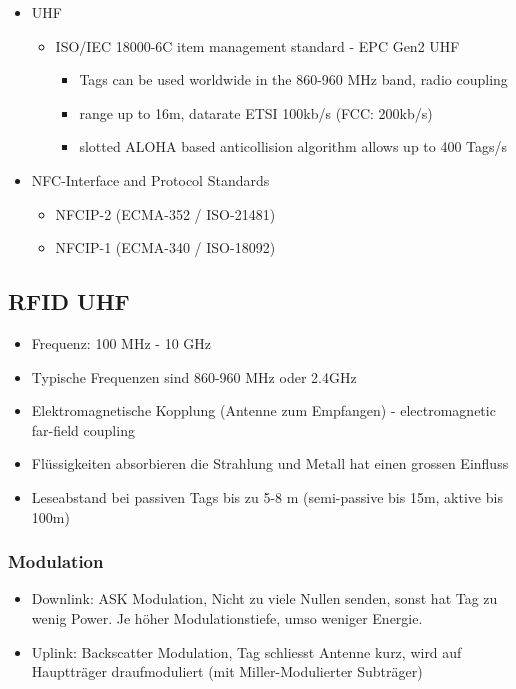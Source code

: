 \begin{itemize}
\begin{itemize}
			\end{itemize}
		\item UHF
			\begin{itemize}
				\item ISO/IEC 18000-6C item management standard - EPC Gen2 UHF
					\begin{itemize}
						\item Tags can be used worldwide in the 860-960 MHz band, radio coupling
						\item range up to 16m, datarate ETSI 100kb/s (FCC: 200kb/s)
						\item slotted ALOHA based anticollision algorithm allows up to 400 Tags/s
					\end{itemize}
			\end{itemize}
		\item NFC-Interface and Protocol Standards
			\begin{itemize}
				\item NFCIP-2 (ECMA-352 / ISO-21481) 
				\item NFCIP-1 (ECMA-340 / ISO-18092) 
			\end{itemize}
	\end{itemize}
\subsection{RFID UHF}
	\begin{itemize}
		\item Frequenz:	100 MHz - 10 GHz
		\item Typische Frequenzen sind 860-960 MHz oder 2.4GHz
		\item Elektromagnetische Kopplung (Antenne zum Empfangen) - electromagnetic far-field coupling
		\item Flüssigkeiten absorbieren die Strahlung und Metall hat einen grossen Einfluss
		\item Leseabstand bei passiven Tags bis zu 5-8 m (semi-passive bis 15m, aktive bis 100m)
		
	\end{itemize}

\subsubsection{Modulation}
	\begin{itemize}
		\item Downlink: ASK Modulation, Nicht zu viele Nullen senden, sonst hat Tag zu wenig Power. Je höher Modulationstiefe, umso weniger Energie. 
		\item Uplink: Backscatter Modulation, Tag schliesst Antenne kurz, wird auf Hauptträger draufmoduliert (mit Miller-Modulierter Subträger)
	\end{itemize}

